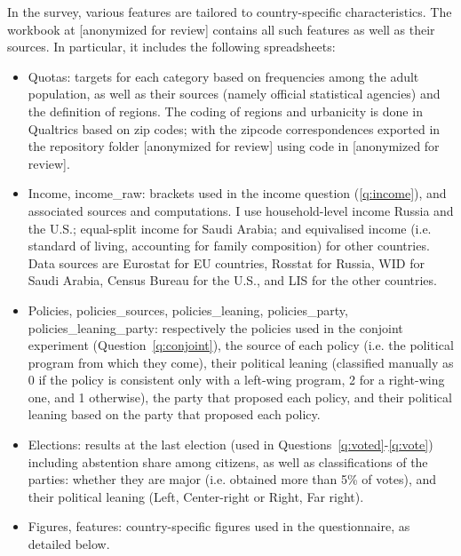In the survey, various features are tailored to country-specific characteristics. 
The workbook at [anonymized for review] %
contains all such features as well as their sources. %
In particular, it includes the following spreadsheets:
\begin{itemize}
    \item Quotas: targets for each category based on frequencies among the adult population, as well as their sources (namely official statistical agencies) and the definition of regions. The coding of regions and urbanicity is done in Qualtrics based on zip codes; with the zipcode correspondences exported in the repository folder [anonymized for review] %
    using code in [anonymized for review]. %
    \item Income, income\_raw: brackets used in the income question (\ref{q:income}), and associated sources and computations. I use household-level income Russia and the U.S.; equal-split income for Saudi Arabia; and equivalised income (i.e. standard of living, accounting for family composition) for other countries. Data sources are Eurostat for EU countries, Rosstat for Russia, WID for Saudi Arabia, Census Bureau for the U.S., and LIS for the other countries. 
    \item Policies, policies\_sources, policies\_leaning, policies\_party, policies\_leaning\_party: respectively the policies used in the conjoint experiment (Question~\ref{q:conjoint}), the source of each policy (i.e. the political program from which they come), their political leaning (classified manually as 0 if the policy is consistent only with a left-wing program, 2 for a right-wing one, and 1 otherwise), the party that proposed each policy, and their political leaning based on the party that proposed each policy.
    \item Elections: results at the last election (used in Questions~\ref{q:voted}-\ref{q:vote}) including abstention share among citizens, as well as classifications of the parties: whether they are major (i.e. obtained more than 5\% of votes), and their political leaning (Left, Center-right or Right, Far right). 
    \item Figures, features: country-specific figures used in the questionnaire, as detailed below.
\end{itemize}

